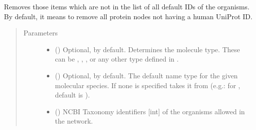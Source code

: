 \documentclass[letterpaper,10pt,english]{sphinxmanual}
\begin{document}
\begin{fulllineitems}
\begin{fulllineitems}
\label{\detokenize{reference:pypath.main.PyPath.delete_unknown}}
Removes those items which are not in the list of all default
IDs of the organisms. By default, it means to remove all protein
nodes not having a human UniProt ID.
\begin{quote}\begin{description}
\item[{Parameters}] \leavevmode\begin{itemize}
\item {} 
 () \textendash{} Optional,  by default. Determines the molecule
type. These can be , , ,
 or any other type defined in
.

\item {} 
 () \textendash{} Optional,  by default. The default name type for the
given molecular species. If none is specified takes it from
 (e.g.: for
, default is ).

\item {} 
 () \textendash{} NCBI Taxonomy identifiers {[}int{]} of the organisms allowed in
the network.

\end{itemize}

\end{description}\end{quote}

\end{fulllineitems}



\end{fulllineitems}
\end{document}
